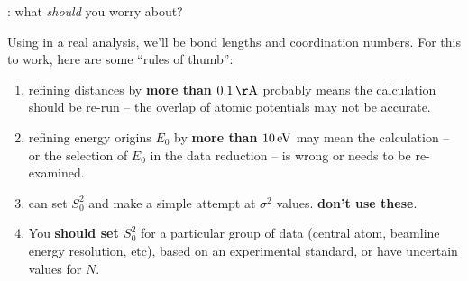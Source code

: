 \begin{slide}{{\feff}:  what {\em{should}} you worry about?}

  Using {\feff} in a real analysis, we'll be {}
  bond lengths and coordination numbers.  For this to work, here are some
  ``rules of thumb'':

  \begin{cenpage}{90mm}

\begin{enumerate}
   \item refining distances by {\bf{more than $0.1\rm\,\AA$}} probably means
  the calculation should be re-run -- the overlap of atomic potentials may
  not be accurate.

   \item  refining energy origins $E_0$ by {\bf{more than $10\rm\,eV$}} may
  mean the calculation -- or the selection of $E_0$ in the data reduction
  -- is wrong or needs to be re-examined.

 \item  {\feff} can set $S_0^2$ and make a simple attempt at
  $\sigma^2$ values.  {\bf{don't use these}}.

 \item You {\bf{should set $S_0^2$}} for a particular group
  of data (central atom, beamline energy resolution, etc), based on an
  experimental standard, or have uncertain values for $N$.
  \end{enumerate}
  \end{cenpage}

\end{slide}
